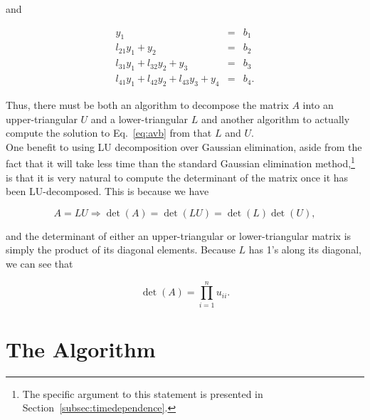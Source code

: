 \documentclass[12pt]{article}
\numberwithin{equation}{section}
\begin{document}
\noindent and

$$\begin{array}{rcc}y_{1}&=&b_{1} \\
l_{21}y_{1}+y_{2}&=&b_{2} \\
l_{31}y_{1}+l_{32}y_{2}+y_{3}&=&b_{3} \\
l_{41}y_{1}+l_{42}y_{2}+l_{43}y_{3}+y_{4}&=&b_{4}.\end{array}$$
\vspace{.2cm}

\noindent Thus, there must be both an algorithm to decompose the matrix $A$ into an upper-triangular $U$ and a lower-triangular $L$ and another algorithm to actually compute the solution to Eq.~\ref{eq:avb} from that $L$ and $U$.
\\\indent One benefit to using LU decomposition over Gaussian elimination, aside from the fact that it will take less time than the standard Gaussian elimination method,\footnote{The specific argument to this statement is presented in Section~\ref{subsec:timedependence}.}  is that it is very natural to compute the determinant of the matrix once it has been LU-decomposed.  This is because we have 

$$A=LU \Rightarrow \det\left(A\right)=\det\left(LU\right)=\det\left(L\right)\det\left(U\right),$$

\noindent and the determinant of either an upper-triangular or lower-triangular matrix is simply the product of its diagonal elements.  Because $L$ has 1's along its diagonal, we can see that

\begin{equation}
\det\left(A\right)=\prod_{i=1}^{n}u_{ii}.
\end{equation}
\vspace{.2cm}

\section{The Algorithm}
\label{sec:algorithm}
\end{document}
